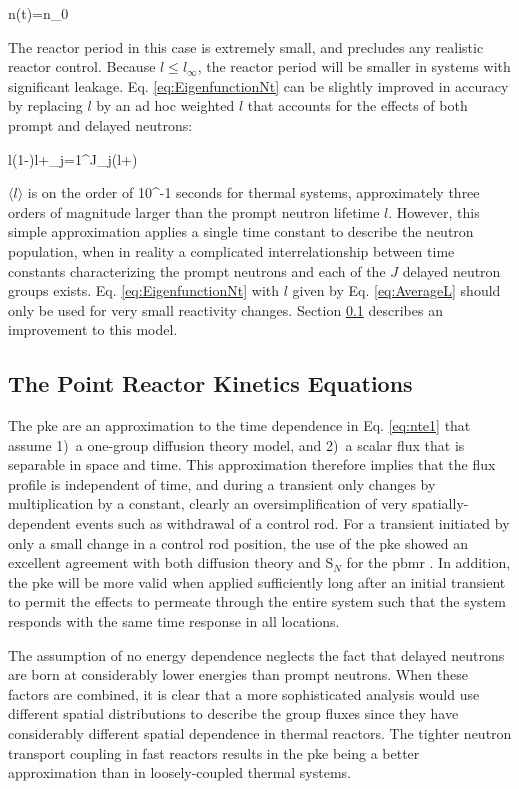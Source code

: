 \beq
\label{eq:EigenfunctionNt}
n(t)=n_0
\eeq

The reactor period in this case is extremely small, and precludes any realistic reactor control. Because \(l\leq l_\infty\), the reactor period will be smaller in systems with significant leakage. Eq. \eqref{eq:EigenfunctionNt} can be slightly improved in accuracy by replacing \(l\) by an ad hoc weighted \(l\) that accounts for the effects of both prompt and delayed neutrons:

\beq
\label{eq:AverageL}
\langle l\rangle\equiv(1-\beta)l+\sum_{j=1}^J\beta_j\left(l+\right)
\eeq

\(\langle l\rangle\) is on the order of 10^{-1} seconds for thermal systems, approximately three orders of magnitude larger than the prompt neutron lifetime \(l\). However, this simple approximation applies a single time constant to describe the neutron population, when in reality a complicated interrelationship between time constants characterizing the prompt neutrons and each of the \(J\) delayed neutron groups exists. Eq. \eqref{eq:EigenfunctionNt} with \(l\) given by Eq. \eqref{eq:AverageL} should only be used for very small reactivity changes. Section \ref{sec:PKE} describes an improvement to this model.

\subsection{The Point Reactor Kinetics Equations}
\label{sec:PKE}

The \gls{pke} are an approximation to the time dependence in Eq. \eqref{eq:nte1} that assume 1)~a one-group diffusion theory model, and 2)~a scalar flux that is separable in space and time. This approximation therefore implies that the flux profile is independent of time, and during a transient only changes by multiplication by a constant, clearly an oversimplification of very spatially-dependent events such as withdrawal of a control rod. For a transient initiated by only a small change in a control rod position, the use of the \gls{pke} showed an excellent agreement with both diffusion theory and S$_N$ for the \gls{pbmr} \cite{tyobeka}. In addition, the \gls{pke} will be more valid when applied sufficiently long after an initial transient to permit the effects to permeate through the entire system such that the system responds with the same time response in all locations.

The assumption of no energy dependence neglects the fact that delayed neutrons are born at considerably lower energies than prompt neutrons. When these factors are combined, it is clear that a more sophisticated analysis would use different spatial distributions to describe the group fluxes since they have considerably different spatial dependence in thermal reactors. The tighter neutron transport coupling in fast reactors results in the \gls{pke} being a better approximation than in loosely-coupled thermal systems.

